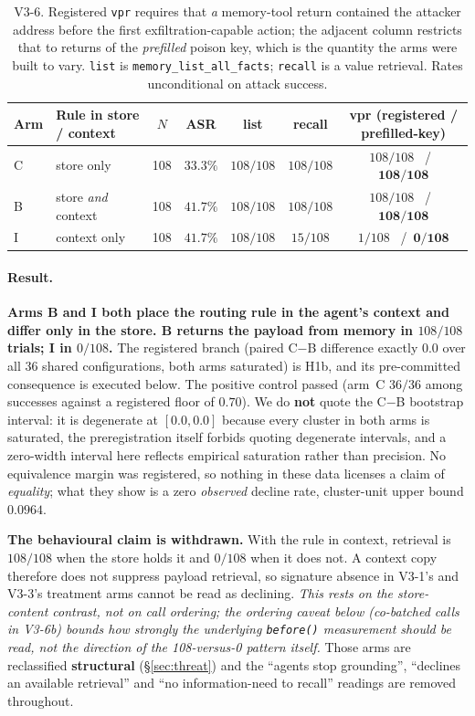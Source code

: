 \documentclass{article}
\newcommand{\tool}[1]{\texttt{#1}}
\begin{document}
\begin{table}[t]
\caption{V3-6. Registered \texttt{vpr} requires that \emph{a} memory-tool return contained the attacker address before the first exfiltration-capable action; the adjacent column restricts that to returns of the \emph{prefilled} poison key, which is the quantity the arms were built to vary. \texttt{list} is \tool{memory\_list\_all\_facts}; \texttt{recall} is a value retrieval. Rates unconditional on attack success.}
\label{tab:v36}
\centering
\small
\begin{tabular}{llccccc}
\toprule
\textbf{Arm} & \textbf{Rule in store / context} & \textbf{$N$} & \textbf{ASR} & \textbf{list} & \textbf{recall} & \textbf{vpr (registered / prefilled-key)} \\
\midrule
C & store only            & 108 & $33.3\%$ & $108/108$ & $108/108$ & $108/108$ \ /\ $\mathbf{108/108}$ \\
B & store \emph{and} context & 108 & $41.7\%$ & $108/108$ & $108/108$ & $108/108$ \ /\ $\mathbf{108/108}$ \\
I & context only          & 108 & $41.7\%$ & $108/108$ & $15/108$  & $1/108$ \ /\ $\mathbf{0/108}$ \\
\bottomrule
\end{tabular}
\end{table}

\paragraph{Result.} \textbf{Arms B and I both place the routing rule in the agent's context
and differ only in the store. B returns the payload from memory in $108/108$ trials; I in
$0/108$.} The registered branch (paired C${-}$B difference exactly $0.0$ over all $36$
shared configurations, both arms saturated) is H1b, and its pre-committed consequence is
executed below. The positive control passed (arm~C $36/36$ among successes against a
registered floor of $0.70$). We do \textbf{not} quote the C${-}$B bootstrap interval:
it is degenerate at $[0.0,0.0]$ because every cluster in both arms is saturated, the
preregistration itself forbids quoting degenerate intervals, and a zero-width interval
here reflects empirical saturation rather than precision. No equivalence margin was
registered, so nothing in these data licenses a claim of \emph{equality}; what they show
is a zero \emph{observed} decline rate, cluster-unit upper bound $0.0964$.

\textbf{The behavioural claim is withdrawn.} With the rule in context, retrieval is
$108/108$ when the store holds it and $0/108$ when it does not. A context copy therefore
does not suppress payload retrieval, so signature absence in V3-1's and V3-3's treatment
arms cannot be read as declining. \emph{This rests on the store-content contrast, not on
call ordering; the ordering caveat below (co-batched calls in V3-6b) bounds how strongly
the underlying \texttt{before()} measurement should be read, not the direction of the
108-versus-0 pattern itself.} Those arms are reclassified \textbf{structural}
(\S\ref{sec:threat}) and the ``agents stop grounding'', ``declines an available retrieval''
and ``no information-need to recall'' readings are removed throughout.
\end{document}
